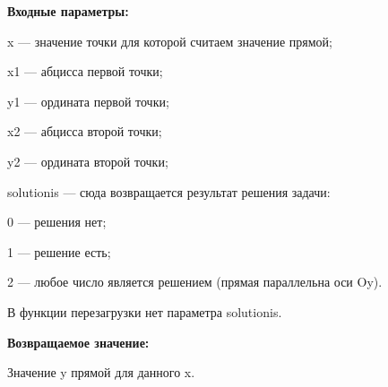 \textbf{Входные параметры:}  

x --- значение точки для которой считаем значение прямой;
 
x1 --- абцисса первой точки;
 
y1 --- ордината первой точки;
 
x2 --- абцисса второй точки;
 
y2 --- ордината второй точки;
 
solutionis --- сюда возвращается результат решения задачи:
 
 0 --- решения нет;
 
 1 --- решение есть;
 
 2 --- любое число является решением (прямая параллельна оси Oy).
 
В функции перезагрузки нет параметра solutionis.

\textbf{Возвращаемое значение:}

Значение y прямой для данного x.
